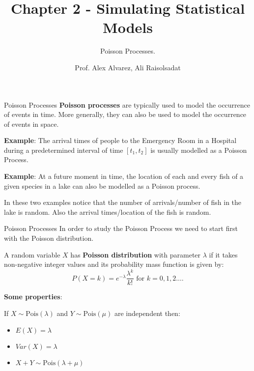 \documentclass[8pt]{beamer}
\title{Chapter 2 - Simulating Statistical Models}
\subtitle{Poisson Processes.}
\author{Prof. Alex Alvarez, Ali Raisolsadat}
\institute{School of Mathematical and Computational Sciences \\ University of Prince Edward Island}
\date{} %
\begin{document}
\maketitle

\begin{frame}{Poisson Processes}
\textbf{Poisson processes} are typically used to model the occurrence of events in time. More generally, they can also be used to model the occurrence of events in space.

\vspace{2mm}

\textbf{Example}: The arrival times of people to the Emergency Room in a Hospital during a predetermined interval of time $[t_1,t_2]$ is usually modelled as a Poisson Process.

\vspace{2mm}

\textbf{Example}: At a future moment in time, the location of each and every fish of a given species in a lake can also be modelled as a Poisson process.

\vspace{2mm}

In these two examples notice that the number of arrivals/number of fish in the lake is random. Also the  arrival times/location of the fish is random.
\end{frame}

\begin{frame}{Poisson Processes}
In order to study the Poisson Process we need to start first with the Poisson distribution.

\vspace{2mm}

A random variable $X$ has \textbf{Poisson distribution} with parameter $\lambda$ if it takes non-negative integer values and its probability mass function is given by:
$$P(X=k)=e^{-\lambda}\frac{\lambda^k}{k!} \text{ for } k=0,1,2.\ldots$$

\vspace{2mm}

\textbf{Some properties}:

\vspace{2mm}

If $X \sim \text{Pois}(\lambda)$ and $Y\sim \text{Pois}(\mu)$ are independent  then:

\begin{itemize}
	\item $E(X)=\lambda$
	\item $Var(X)=\lambda$
	\item $X+Y \sim \text{Pois}(\lambda+\mu)$
	\end{itemize}
\end{frame}
\end{document}
